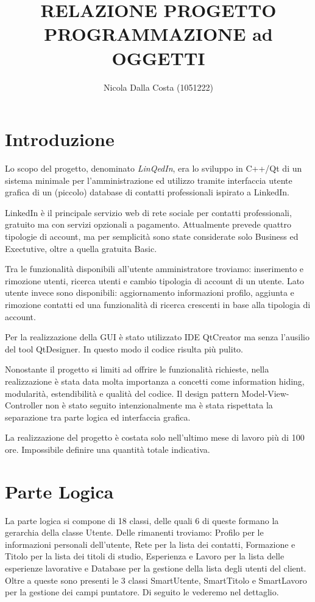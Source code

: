 \documentclass[a4paper,openany]{article}
\title{RELAZIONE PROGETTO\\PROGRAMMAZIONE ad OGGETTI}
\author{Nicola Dalla Costa (1051222)}
\date{}
\begin{document}
\maketitle
\raggedbottom

\section*{Introduzione}
Lo scopo del progetto, denominato \textit{LinQedIn}, era lo sviluppo in C++/Qt di un sistema minimale per l'amministrazione ed utilizzo tramite interfaccia utente grafica di un (piccolo) database di contatti professionali ispirato a LinkedIn. 

LinkedIn è il principale servizio web di rete sociale per contatti professionali, gratuito ma con servizi opzionali a pagamento. Attualmente prevede quattro tipologie di account, ma per semplicità sono state considerate solo Business ed Exectutive, oltre a quella gratuita Basic.

Tra le funzionalità disponibili all'utente amministratore troviamo: inserimento e rimozione utenti, ricerca utenti e cambio tipologia di account di un utente. Lato utente invece sono disponibili: aggiornamento informazioni profilo, aggiunta e rimozione contatti ed una funzionalità di ricerca crescenti in base alla tipologia di account.

Per la realizzazione della GUI è stato utilizzato IDE QtCreator ma senza l'ausilio del tool QtDesigner. In questo modo il codice risulta più pulito.

Nonostante il progetto si limiti ad offrire le funzionalità richieste, nella realizzazione è stata data molta importanza a concetti come information hiding, modularità, estendibilità e qualità del codice. Il design pattern Model-View-Controller non è stato seguito intenzionalmente ma è stata rispettata la separazione tra parte logica ed interfaccia grafica.

La realizzazione del progetto è costata solo nell'ultimo mese di lavoro più di 100 ore. Impossibile definire una quantità totale indicativa.

\section*{Parte Logica}
La parte logica si compone di 18 classi, delle quali 6 di queste formano la gerarchia della classe Utente. Delle rimanenti troviamo: Profilo per le informazioni personali dell'utente, Rete per la lista dei contatti, Formazione e Titolo per la lista dei titoli di studio, Esperienza e Lavoro per la lista delle esperienze lavorative e Database per la gestione della lista degli utenti del client. Oltre a queste sono presenti le 3 classi SmartUtente, SmartTitolo e SmartLavoro per la gestione dei campi puntatore. Di seguito le vederemo nel dettaglio.
\end{document}
